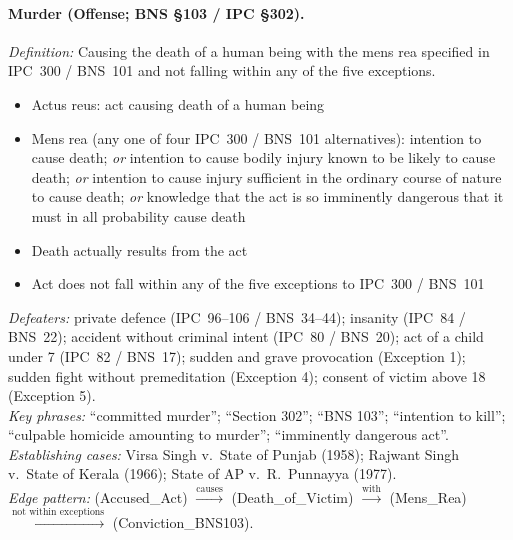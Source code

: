 \documentclass[11pt]{article}
\begin{document}
\paragraph{Murder (Offense; BNS \S103 / IPC \S302).}
\textit{Definition:} Causing the death of a human being with the mens rea specified in IPC~300 / BNS~101 and not falling within any of the five exceptions.
\begin{itemize}[nosep,leftmargin=*]
  \item[\textsc{and}] Actus reus: act causing death of a human being
  \item[\textsc{and}] Mens rea (any one of four IPC~300 / BNS~101 alternatives): intention to cause death; \emph{or} intention to cause bodily injury known to be likely to cause death; \emph{or} intention to cause injury sufficient in the ordinary course of nature to cause death; \emph{or} knowledge that the act is so imminently dangerous that it must in all probability cause death
  \item[\textsc{and}] Death actually results from the act
  \item[\textsc{and}] Act does not fall within any of the five exceptions to IPC~300 / BNS~101
\end{itemize}
\textit{Defeaters:} private defence (IPC~96--106 / BNS~34--44); insanity (IPC~84 / BNS~22); accident without criminal intent (IPC~80 / BNS~20); act of a child under 7 (IPC~82 / BNS~17); sudden and grave provocation (Exception 1); sudden fight without premeditation (Exception 4); consent of victim above 18 (Exception 5).\\
\textit{Key phrases:} ``committed murder''; ``Section 302''; ``BNS 103''; ``intention to kill''; ``culpable homicide amounting to murder''; ``imminently dangerous act''.\\
\textit{Establishing cases:} Virsa Singh v.\ State of Punjab (1958); Rajwant Singh v.\ State of Kerala (1966); State of AP v.\ R.\ Punnayya (1977).\\
\textit{Edge pattern:} (Accused\_Act) $\xrightarrow{\text{causes}}$ (Death\_of\_Victim) $\xrightarrow{\text{with}}$ (Mens\_Rea) $\xrightarrow{\text{not within exceptions}}$ (Conviction\_BNS103).
\end{document}
